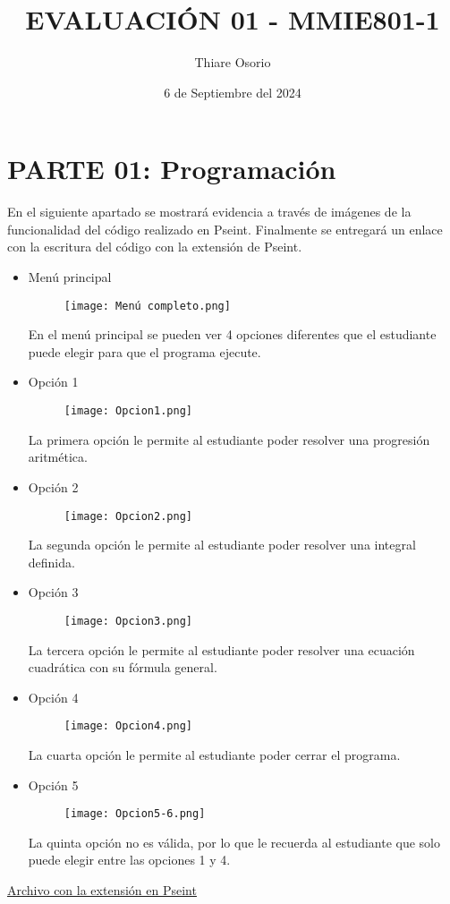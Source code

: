 \documentclass{article}
\title{EVALUACIÓN 01 - MMIE801-1}
\author{Thiare Osorio}
\date{6 de Septiembre del 2024}
\begin{document}
\maketitle
\section*{PARTE 01: Programación}
En el siguiente apartado se mostrará evidencia a través de imágenes de la funcionalidad del código realizado en Pseint. Finalmente se entregará un enlace con la escritura del código con la extensión de Pseint.
\begin{itemize}
    \item Menú principal
    \begin{figure}[H]
    \centering
    \texttt{[image: Menú completo.png]}
\end{figure}  
En el menú principal se pueden ver 4 opciones diferentes que el estudiante puede elegir para que el programa ejecute.
\newpage
    \item Opción 1
    \begin{figure}[H]
    \centering
    \texttt{[image: Opcion1.png]}
\end{figure}
La primera opción le permite al estudiante poder resolver una progresión aritmética.
\newpage
    \item Opción 2
    \begin{figure}[H]
    \centering
    \texttt{[image: Opcion2.png]}
\end{figure}
La segunda opción le permite al estudiante poder resolver una integral definida.
\newpage
    \item Opción 3
    \begin{figure}[H]
    \centering
    \texttt{[image: Opcion3.png]}
\end{figure}
La tercera opción le permite al estudiante poder resolver una ecuación cuadrática con su fórmula general.
\newpage
    \item Opción 4
    \begin{figure}[H]
    \centering
    \texttt{[image: Opcion4.png]}
\end{figure}
La cuarta opción le permite al estudiante poder cerrar el programa.
\newpage
    \item Opción 5
    \begin{figure}[H]
    \centering
    \texttt{[image: Opcion5-6.png]}
\end{figure}
La quinta opción no es válida, por lo que le recuerda al estudiante que solo puede elegir entre las opciones 1 y 4.
\end{itemize}
\href{https://github.com/ThiareAlejandra/codigopseint/tree/2af2e7bece1958fd25acaafc973ef68b9b4f010a}{Archivo con la extensión en Pseint} 
\newpage
\end{document}
